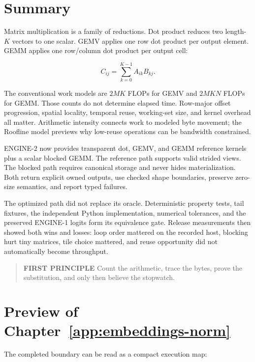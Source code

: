 \section{Summary}\label{summary-5}

Matrix multiplication is a family of reductions. Dot product reduces two
length-\(K\) vectors to one scalar. GEMV applies one row dot product per
output element. GEMM applies one row/column dot product per output cell:

\begin{equation}
C_{ij}=\sum_{k=0}^{K-1}A_{ik}B_{kj}.
\end{equation}

The conventional work models are \(2MK\) FLOPs for GEMV and \(2MKN\)
FLOPs for GEMM. Those counts do not determine elapsed time. Row-major
offset progression, spatial locality, temporal reuse, working-set size,
and kernel overhead all matter. Arithmetic intensity connects work to
modeled byte movement; the Roofline model previews why low-reuse
operations can be bandwidth constrained.

ENGINE-2 now provides transparent dot, GEMV, and GEMM reference kernels
plus a scalar blocked GEMM. The reference path supports valid strided
views. The blocked path requires canonical storage and never hides
materialization. Both return explicit owned outputs, use checked shape
boundaries, preserve zero-size semantics, and report typed failures.

The optimized path did not replace its oracle. Deterministic property
tests, tail fixtures, the independent Python implementation, numerical
tolerances, and the preserved ENGINE-1 logits form its equivalence gate.
Release measurements then showed both wins and losses: loop order
mattered on the recorded host, blocking hurt tiny matrices, tile choice
mattered, and reuse opportunity did not automatically become throughput.

\begin{quote}
\textbf{FIRST PRINCIPLE} Count the arithmetic, trace the bytes, prove
the substitution, and only then believe the stopwatch.
\end{quote}

\section{Preview of Chapter~\ref{app:embeddings-norm}}\label{chapter-7-preview}

The completed boundary can be read as a compact execution map:


